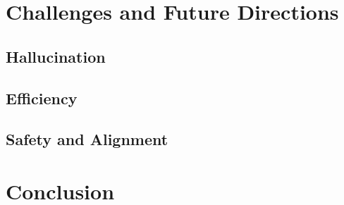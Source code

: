 \documentclass[conference]{IEEEtran}
\begin{document}
\section{Challenges and Future Directions}
\label{sec:challenges}

\subsection{Hallucination}

\subsection{Efficiency}

\subsection{Safety and Alignment}

\section{Conclusion}
\label{sec:conclusion}



\end{document}
